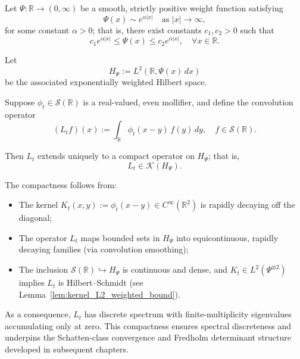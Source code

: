 \begin{proposition}[Compactness of \( L_t \)]
\label{prop:compactness-Lt}
Let \( \Psi \colon \mathbb{R} \to (0,\infty) \) be a smooth, strictly positive weight function satisfying
\[
\Psi(x) \sim e^{\alpha|x|} \quad \text{as } |x| \to \infty,
\]
for some constant \( \alpha > 0 \); that is, there exist constants \( c_1, c_2 > 0 \) such that
\[
c_1 e^{\alpha |x|} \le \Psi(x) \le c_2 e^{\alpha |x|}, \quad \forall x \in \mathbb{R}.
\]

Let
\[
H_\Psi := L^2(\mathbb{R}, \Psi(x)\, dx)
\]
be the associated exponentially weighted Hilbert space.

Suppose \( \phi_t \in \mathcal{S}(\mathbb{R}) \) is a real-valued, even mollifier, and define the convolution operator
\[
(L_t f)(x) := \int_{\mathbb{R}} \phi_t(x - y)\, f(y)\, dy, \quad f \in \mathcal{S}(\mathbb{R}).
\]

Then \( L_t \) extends uniquely to a compact operator on \( H_\Psi \); that is,
\[
L_t \in \mathcal{K}(H_\Psi).
\]

\noindent The compactness follows from:
\begin{itemize}
    \item The kernel \( K_t(x,y) := \phi_t(x - y) \in C^\infty(\mathbb{R}^2) \) is rapidly decaying off the diagonal;
    \item The operator \( L_t \) maps bounded sets in \( H_\Psi \) into equicontinuous, rapidly decaying families (via convolution smoothing);
    \item The inclusion \( \mathcal{S}(\mathbb{R}) \hookrightarrow H_\Psi \) is continuous and dense, and \( K_t \in L^2(\Psi^{\otimes 2}) \) implies \( L_t \) is Hilbert–Schmidt (see Lemma~\ref{lem:kernel_L2_weighted_bound}).
\end{itemize}

\medskip
\noindent As a consequence, \( L_t \) has discrete spectrum with finite-multiplicity eigenvalues accumulating only at zero. This compactness ensures spectral discreteness and underpins the Schatten-class convergence and Fredholm determinant structure developed in subsequent chapters.
\end{proposition}
